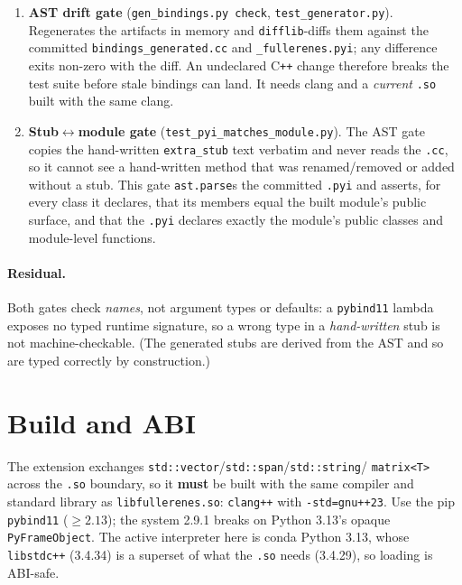 \documentclass[11pt]{article}
\newcommand{\code}[1]{\lstinline[style=py]!#1!}
\begin{document}
\begin{enumerate}[leftmargin=1.6em]
\item \textbf{AST drift gate} (\code{gen_bindings.py check}, \code{test_generator.py}).
  Regenerates the artifacts in memory and \texttt{difflib}-diffs them against the committed
  \texttt{bindings\_generated.cc} and \texttt{\_fullerenes.pyi}; any difference exits non-zero
  with the diff. An undeclared C\texttt{++} change therefore breaks the test suite before
  stale bindings can land. It needs clang and a \emph{current} \texttt{.so} built with the same
  clang.
\item \textbf{Stub$\leftrightarrow$module gate} (\code{test_pyi_matches_module.py}). The AST gate
  copies the hand-written \texttt{extra\_stub} text verbatim and never reads the
  \texttt{.cc}, so it cannot see a hand-written method that was renamed/removed or added
  without a stub. This gate \texttt{ast.parse}s the committed \texttt{.pyi} and asserts, for
  every class it declares, that its members equal the built module's public surface, and
  that the \texttt{.pyi} declares exactly the module's public classes and module-level
  functions.
\end{enumerate}

\paragraph{Residual.} Both gates check \emph{names}, not argument types or defaults: a
\texttt{pybind11} lambda exposes no typed runtime signature, so a wrong type in a
\emph{hand-written} stub is not machine-checkable. (The generated stubs are derived from the
AST and so are typed correctly by construction.)

\section{Build and ABI}
\label{sec:build}

The extension exchanges \texttt{std::vector}/\texttt{std::span}/\texttt{std::string}/
\texttt{matrix<T>} across the \texttt{.so} boundary, so it \textbf{must} be built with the
same compiler and standard library as \texttt{libfullerenes.so}: \texttt{clang++} with
\texttt{-std=gnu++23}. Use the pip \texttt{pybind11} ($\ge 2.13$); the system 2.9.1 breaks
on Python 3.13's opaque \texttt{PyFrameObject}. The active interpreter here is conda Python
3.13, whose \texttt{libstdc++} (3.4.34) is a superset of what the \texttt{.so} needs (3.4.29),
so loading is ABI-safe.
\end{document}
